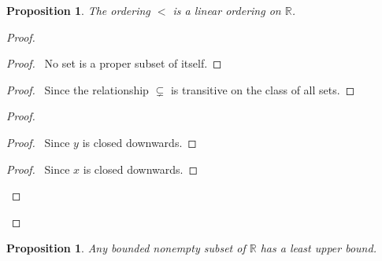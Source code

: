 \documentclass{book}
\let\qed\relax
\newtheorem{prop}[ax]{Proposition}
\theoremstyle{definition}
\begin{document}
\begin{prop}
The ordering $<$ is a linear ordering on $\mathbb{R}$.
\end{prop}

\begin{proof}
\pf
{}
\begin{proof}
	\pf\ No set is a proper subset of itself.
\end{proof}
\begin{proof}
	\pf\ Since the relationship $\subsetneq$ is transitive on the class of all sets.
\end{proof}
\begin{proof}
	\begin{proof}
		\pf\ Since $y$ is closed downwards.
	\end{proof}
	\begin{proof}
		\pf\ Since $x$ is closed downwards.
	\end{proof}
\end{proof}
\qed
\end{proof}

\begin{prop}
Any bounded nonempty subset of $\mathbb{R}$ has a least upper bound.
\end{prop}
\end{document}
